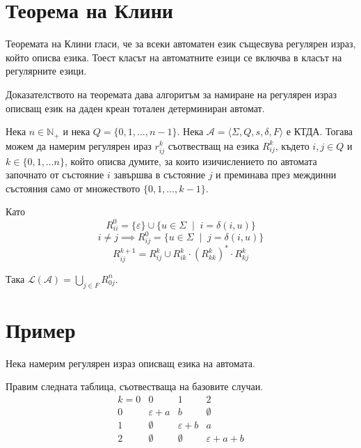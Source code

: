 \documentclass[12pt]{article}
\begin{document}
\section{Теорема на Клини}
Теоремата на Клини гласи, че за всеки автоматен език същесвува регулярен израз, който описва езика.
Тоест класът на автоматните езици се включва в класът на регулярните езици.

Доказателството на теоремата дава алгоритъм за намиране на регулярен израз описващ език на даден креан тотален детерминиран автомат.

Нека \(n \in \mathbb{N}_+\) и нека \(Q = \{0, 1, \dots, n - 1\}\).
Нека \(\mathcal{A} = \langle \Sigma, Q, s, \delta, F \rangle\) е КТДА.
Тогава можем да намерим регулярен ираз \(r_{ij}^k\) съотвестващ на езика \(R_{ij}^k\), където \(i, j \in Q\) и \(k \in \{0, 1, \dots n\}\),
който описва думите, за които изичислението по автомата започнато от състояние \(i\) завършва в състояние \(j\) и преминава през междинни състояния само от множеството \(\{0, 1, \dots, k - 1\}\).

Като
\[R_{ii}^0 = \{\varepsilon\} \cup \{u \in \Sigma \;\mid\; i = \delta(i, u) \}\]
\[i \neq j \implies R_{ij}^0 = \{u \in \Sigma \;\mid\; j = \delta(i, u) \}\]
\[R_{ij}^{k + 1} = R_{ij}^k \cup R_{ik}^k \cdot (R_{kk}^k)^* \cdot R_{kj}^k\]

Така \(\mathcal{L}(\mathcal{A}) = \displaystyle\bigcup_{j \in F} R_{0j}^n\).


\section{Пример}

Нека намерим регулярен израз описващ езика на автомата.

\begin{center}
\end{center}

Правим следната таблица, съотвестваща на базовите случаи.
\[\begin{array}{c|ccc}
k = 0 & 0 & 1   & 2     \\ \hline
0   & \varepsilon + a & b & \emptyset \\
1   & \emptyset & \varepsilon + b & a \\
2   & \emptyset & \emptyset & \varepsilon + a + b 
\end{array}\]
\end{document}

